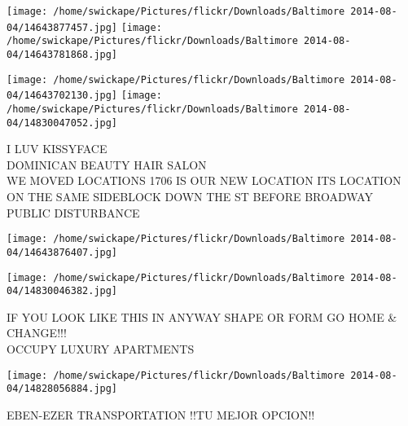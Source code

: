\documentclass[10pt,letterpaper]{article}
\begin{document}
\texttt{[image: /home/swickape/Pictures/flickr/Downloads/Baltimore 2014-08-04/14643877457.jpg]}
\texttt{[image: /home/swickape/Pictures/flickr/Downloads/Baltimore 2014-08-04/14643781868.jpg]}

\texttt{[image: /home/swickape/Pictures/flickr/Downloads/Baltimore 2014-08-04/14643702130.jpg]}
\texttt{[image: /home/swickape/Pictures/flickr/Downloads/Baltimore 2014-08-04/14830047052.jpg]}

I LUV KISSYFACE\\
DOMINICAN BEAUTY HAIR SALON\\
WE MOVED LOCATIONS 1706 IS OUR NEW LOCATION ITS LOCATION ON THE SAME SIDEBLOCK DOWN THE ST BEFORE BROADWAY\\
PUBLIC DISTURBANCE\\
\pagebreak

\texttt{[image: /home/swickape/Pictures/flickr/Downloads/Baltimore 2014-08-04/14643876407.jpg]}

\vspace{0.25in}
\texttt{[image: /home/swickape/Pictures/flickr/Downloads/Baltimore 2014-08-04/14830046382.jpg]}

IF YOU LOOK LIKE THIS IN ANYWAY SHAPE OR FORM GO HOME \& CHANGE!!!\\
OCCUPY LUXURY APARTMENTS\\
\pagebreak

\texttt{[image: /home/swickape/Pictures/flickr/Downloads/Baltimore 2014-08-04/14828056884.jpg]}

EBEN{-}EZER TRANSPORTATION  !!TU MEJOR OPCION!!\\
\pagebreak
\end{document}
